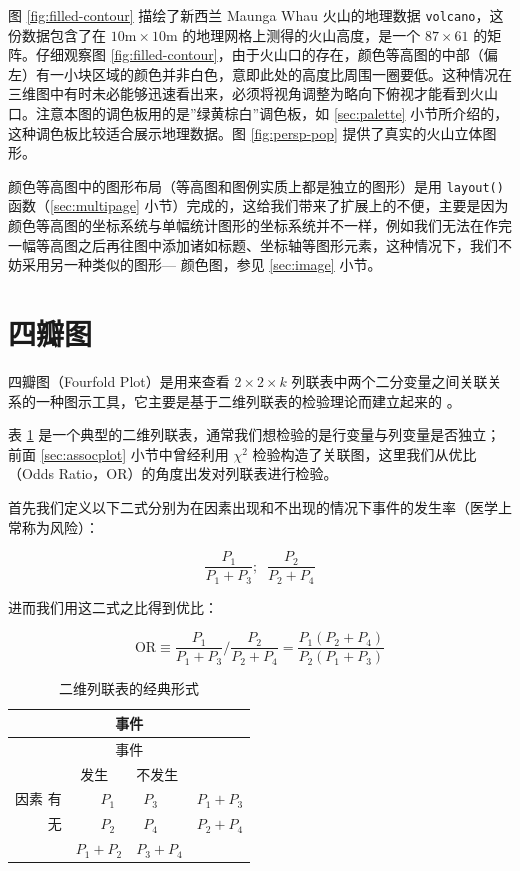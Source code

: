 \documentclass[
  b5paper,
  UTF8,twoside]{book}
\begin{document}
图 \ref{fig:filled-contour}
描绘了新西兰 Maunga Whau 火山的地理数据 \texttt{volcano}，这份数据包含了在 \(10\mathrm{m}\times10\mathrm{m}\) 的地理网格上测得的火山高度，是一个 \(87\times61\) 的矩阵。仔细观察图 \ref{fig:filled-contour}，由于火山口的存在，颜色等高图的中部（偏左）有一小块区域的颜色并非白色，意即此处的高度比周围一圈要低。这种情况在三维图中有时未必能够迅速看出来，必须将视角调整为略向下俯视才能看到火山口。注意本图的调色板用的是''绿黄棕白''调色板，如 \ref{sec:palette} 小节所介绍的，这种调色板比较适合展示地理数据。图 \ref{fig:persp-pop}
提供了真实的火山立体图形。

颜色等高图中的图形布局（等高图和图例实质上都是独立的图形）是用 \texttt{layout()} 函数（\ref{sec:multipage} 小节）完成的，这给我们带来了扩展上的不便，主要是因为颜色等高图的坐标系统与单幅统计图形的坐标系统并不一样，例如我们无法在作完一幅等高图之后再往图中添加诸如标题、坐标轴等图形元素，这种情况下，我们不妨采用另一种类似的图形--- 颜色图，参见 \ref{sec:image} 小节。

\section{四瓣图}\label{sec:fourfoldplot}

四瓣图（Fourfold Plot）是用来查看 \(2\times2\times k\) 列联表中两个二分变量之间关联关系的一种图示工具，它主要是基于二维列联表的检验理论而建立起来的 \citep{Friendly94}。

表 \ref{tab:contingency} 是一个典型的二维列联表，通常我们想检验的是行变量与列变量是否独立；前面 \ref{sec:assocplot} 小节中曾经利用 \(\chi^{2}\) 检验构造了关联图，这里我们从优比（Odds Ratio，OR）的角度出发对列联表进行检验。

首先我们定义以下二式分别为在因素出现和不出现的情况下事件的发生率（医学上常称为风险）：

\begin{equation} 
\frac{P_{1}}{P_{1}+P_{3}};\;\;\frac{P_{2}}{P_{2}+P_{4}}
\label{eq:OR1}
\end{equation}

进而我们用这二式之比得到优比：

\begin{equation} 
\mathrm{OR}\equiv\frac{P_{1}}{P_{1}+P_{3}}/\frac{P_{2}}{P_{2}+P_{4}}=\frac{P_{1}(P_{2}+P_{4})}{P_{2}(P_{1}+P_{3})}
\label{eq:OR}
\end{equation}

\begin{longtable}[]{@{}rcl@{}}
\caption{\label{tab:contingency} 二维列联表的经典形式}\tabularnewline
\toprule\noalign{}
& 事件 & \\
\midrule\noalign{}
\endfirsthead
\toprule\noalign{}
& 事件 & \\
\midrule\noalign{}
\endhead
\bottomrule\noalign{}
\endlastfoot
& 发生　　不发生 & \\
因素 有 & \(P_{1}\)　　\(P_{3}\) & \(P_{1}+P_{3}\) \\
无 & \(P_{2}\)　　\(P_{4}\) & \(P_{2}+P_{4}\) \\
& \(P_{1}+P_{2}\)　\(P_{3}+P_{4}\) & \\
\end{longtable}
\end{document}
